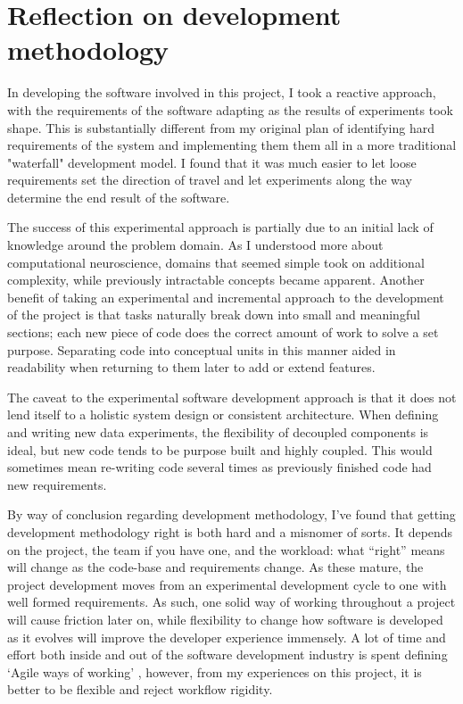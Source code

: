 \section{Reflection on development methodology}

In developing the software involved in this project, I took a reactive approach,
with the requirements of the software adapting as the results of experiments
took shape. This is substantially different from my original plan of identifying hard
requirements of the system and implementing them them all in a more traditional
"waterfall" development model. I found that it was much easier to let loose requirements set the direction of travel and
let experiments along the way determine the end result of the software.

The success of this experimental approach is partially due to an initial lack of
knowledge around the problem domain. As I understood more about computational
neuroscience, domains that seemed simple took on additional complexity, while
previously intractable concepts became apparent. Another benefit of taking an experimental and incremental approach to the
development of the project is that tasks naturally break down into small and
meaningful sections; each new piece of code does the correct amount of work to
solve a set purpose. Separating code into conceptual units in this manner aided
in readability when returning to them later to add or extend features.

The caveat to the experimental software development approach is that it does not
lend itself to a holistic system design or consistent architecture. When
defining and writing new data experiments, the flexibility of decoupled
components is ideal, but new code tends to be purpose built and highly coupled.
This would sometimes mean re-writing code several times as previously finished
code had new requirements.

By way of conclusion regarding development methodology, I’ve found that getting
development methodology right is both hard and a misnomer of sorts. It depends
on the project, the team if you have one, and the workload: what “right” means
will change as the code-base and requirements change. As these mature, the
project development moves from an experimental development cycle to one with
well formed requirements. As such, one solid way of working throughout a project
will cause friction later on, while flexibility to change how software is
developed as it evolves will improve the developer experience immensely. A lot
of time and effort both inside and out of the software development industry is
spent defining `Agile ways of working' \autocite{spolsky_you_2006}, however,
from my experiences on this project, it is better to be flexible and reject
workflow rigidity.

